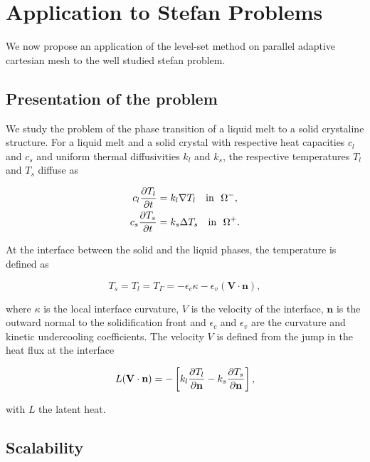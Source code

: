\section{Application to Stefan Problems} \label{sec:application}

We now propose an application of the level-set method on parallel adaptive cartesian mesh to the well studied stefan problem.

\subsection{Presentation of the problem}

We study the problem of the phase transition of a liquid melt to a solid crystaline structure. For a liquid melt and a solid crystal with respective heat capacities $c_l$ and $c_s$ and uniform thermal diffusivities $k_l$ and $k_s$, the respective temperatures $T_l$ and $T_s$ diffuse as

\begin{align*}
c_l \frac{\partial T_l}{\partial t} & = k_l \nabla T_l \quad \mathrm{in} ~~ \Omega^- , \\
c_s \frac{\partial T_s}{\partial t} & = k_s \Delta T_s \quad \mathrm{in} ~~ \Omega^+ .
\end{align*}

At the interface between the solid and the liquid phases, the temperature is defined as

\begin{equation*}
T_s = T_l = T_{\Gamma} = -\epsilon_c \kappa - \epsilon_v (\mathbf{V} \cdot \mathbf{n}),
\end{equation*}

where $\kappa$ is the local interface curvature, $V$ is the velocity of the interface, $\mathbf{n}$ is the outward normal to the solidification front and $\epsilon_c$ and $\epsilon_v$ are the curvature and kinetic undercooling coefficients. The velocity $V$ is defined from the jump in the heat flux at the interface

\begin{equation}
L (\mathbf{V} \cdot \mathbf{n}) = - \left[ k_l \frac{\partial T_l}{\partial \mathbf{n}} - k_s \frac{\partial T_s}{\partial \mathbf{n}} \right],
\end{equation}

with $L$ the latent heat.

\subsection{Scalability}

